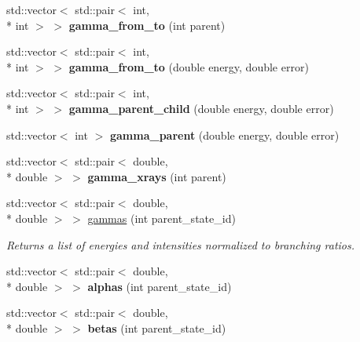 \begin{DoxyCompactItemize}
\item 
\hypertarget{namespacepyne_ab7c78ce8ef6b2242b1b91e4b044b75b1}{std\+::vector$<$ std\+::pair$<$ int, \\*
int $>$ $>$ {\bfseries gamma\+\_\+from\+\_\+to} (int parent)}\label{namespacepyne_ab7c78ce8ef6b2242b1b91e4b044b75b1}

\item 
\hypertarget{namespacepyne_aadaed97b885de370c1a7361a39079021}{std\+::vector$<$ std\+::pair$<$ int, \\*
int $>$ $>$ {\bfseries gamma\+\_\+from\+\_\+to} (double energy, double error)}\label{namespacepyne_aadaed97b885de370c1a7361a39079021}

\item 
\hypertarget{namespacepyne_ab57180e1e9e791ab2480cd4875f6330c}{std\+::vector$<$ std\+::pair$<$ int, \\*
int $>$ $>$ {\bfseries gamma\+\_\+parent\+\_\+child} (double energy, double error)}\label{namespacepyne_ab57180e1e9e791ab2480cd4875f6330c}

\item 
\hypertarget{namespacepyne_a94e4481d01e0d9c2f3d34a11ccdd0e4f}{std\+::vector$<$ int $>$ {\bfseries gamma\+\_\+parent} (double energy, double error)}\label{namespacepyne_a94e4481d01e0d9c2f3d34a11ccdd0e4f}

\item 
\hypertarget{namespacepyne_a0453b68ad87cb9ca636a24000f45c3e6}{std\+::vector$<$ std\+::pair$<$ double, \\*
double $>$ $>$ {\bfseries gamma\+\_\+xrays} (int parent)}\label{namespacepyne_a0453b68ad87cb9ca636a24000f45c3e6}

\item 
std\+::vector$<$ std\+::pair$<$ double, \\*
double $>$ $>$ \hyperlink{namespacepyne_a8eeb397c67e950ae3b78c02a6a09655b}{gammas} (int parent\+\_\+state\+\_\+id)
\begin{DoxyCompactList}\small\item\em Returns a list of energies and intensities normalized to branching ratios. \end{DoxyCompactList}\item 
\hypertarget{namespacepyne_afab6c1fd5c10dd2582c242fc04296e0f}{std\+::vector$<$ std\+::pair$<$ double, \\*
double $>$ $>$ {\bfseries alphas} (int parent\+\_\+state\+\_\+id)}\label{namespacepyne_afab6c1fd5c10dd2582c242fc04296e0f}

\item 
\hypertarget{namespacepyne_af2c502044eaf54a9b575f66f0e38daa3}{std\+::vector$<$ std\+::pair$<$ double, \\*
double $>$ $>$ {\bfseries betas} (int parent\+\_\+state\+\_\+id)}\label{namespacepyne_af2c502044eaf54a9b575f66f0e38daa3}


\end{DoxyCompactItemize}
